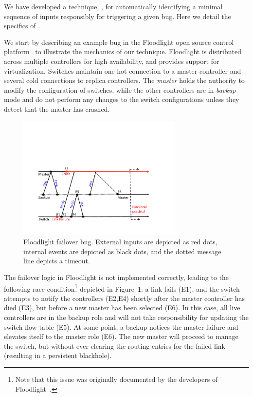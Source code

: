 We have developed a technique, \simulator, for automatically identifying
a minimal sequence of inputs responsibly for triggering a given
bug. Here we detail the specifics of \simulator.

We start by describing an example bug in the Floodlight
open source control platform~\cite{floodlight_bug} to illustrate the mechanics
of our technique. Floodlight is distributed across
multiple controllers for high availability, and provides support for
virtualization. Switches maintain one hot connection to a master controller and
several cold connections to replica controllers. The \emph{master} holds the
authority to modify the configuration of switches, while the other
controllers are in \emph{backup} mode and do not perform any changes to the
switch configurations unless they detect that the master has crashed.

\begin{figure}[t]
    \includegraphics[width=3.25in]{../diagrams/case_study/example_bug.pdf}
    \caption[]{\label{fig:example} Floodlight failover bug. External inputs
               are depicted as red dots, internal events are depicted as black
               dots, and the dotted message line depicts a timeout.}
\end{figure}

The failover logic in Floodlight is not implemented correctly, leading to the
following race condition\footnote{Note that this issue was
originally documented by the developers of Floodlight~\cite{floodlight_bug}.} depicted in
Figure~\ref{fig:example}:
a link fails (E1), and the switch attempts to notify the controllers (E2,E4) shortly after the master
controller has died (E3), but before a new master has been selected (E6). In this case, all live controllers are in
the backup role and will not take responsibility for updating the switch
flow table (E5). At some point, a backup notices the master failure and
elevates itself to the master role (E6). The new master will proceed to manage
the switch, but without ever clearing the routing entries for
the failed link (resulting in a persistent blackhole).

